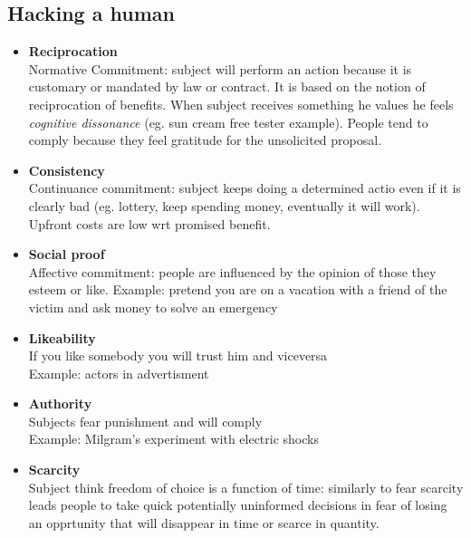 \documentclass[10pt,a4paper]{book}
\begin{document}
\subsection{Hacking a human}
\begin{itemize}
\item \textbf{Reciprocation}\\
Normative Commitment: subject will perform an action because it is customary or mandated by law or contract. It is based on the notion of reciprocation of benefits. When subject receives something he values he feels \emph{cognitive dissonance} (eg. sun cream free tester example). People tend to comply because they feel gratitude for the unsolicited proposal.
\item \textbf{Consistency}\\
Continuance commitment: subject keeps doing a determined actio even if it is clearly bad (eg. lottery, keep spending money, eventually it will work).\\
Upfront costs are low wrt promised benefit.
\item \textbf{Social proof}\\
Affective commitment: people are influenced by the opinion of those they esteem or like. Example: pretend you are on a vacation with a friend of the victim and ask money to solve an emergency
\item \textbf{Likeability}\\
If you like somebody you will trust him and viceversa\\
Example: actors in advertisment
\item \textbf{Authority}\\
Subjects fear punishment and will comply\\
Example: Milgram's experiment with electric shocks
\item \textbf{Scarcity}\\
Subject think freedom of choice is a function of time: similarly to fear scarcity leads people to take quick potentially uninformed decisions in fear of losing an opprtunity that will disappear in time or scarce in quantity. 
\end{itemize}
\end{document}
